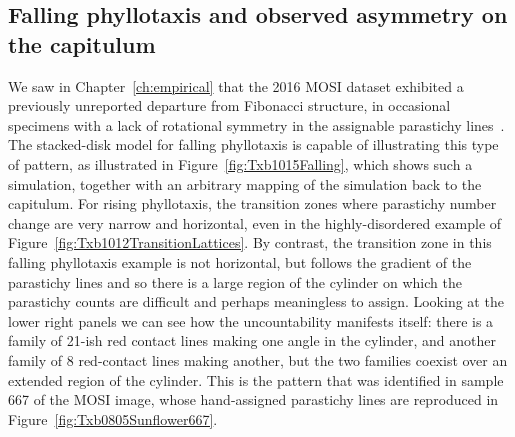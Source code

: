  

\subsection{Falling phyllotaxis and observed asymmetry on the capitulum}

We saw in Chapter~\ref{ch:empirical} that the 2016 MOSI dataset exhibited  a previously unreported departure from Fibonacci structure, in occasional specimens with a lack of rotational symmetry in the assignable parastichy lines~\cite{swintonNovelFibonacciNonFibonacci2016}. 
The stacked-disk model for falling phyllotaxis is  capable of illustrating this type of pattern, as illustrated in Figure~\ref{fig:Txb1015Falling}, which 
shows such a simulation, together with an arbitrary mapping of the simulation back to the capitulum. 
For rising phyllotaxis, the transition zones where parastichy number change are very narrow and horizontal, even in the highly-disordered example of Figure~\ref{fig:Txb1012TransitionLattices}. By contrast, the transition zone in this falling phyllotaxis example is not horizontal, but follows the gradient of the parastichy lines and so  there is a large region of the cylinder on which the parastichy counts are difficult and perhaps meaningless to assign. Looking at the lower right panels we can see how the uncountability manifests itself: there is a family of 21-ish red contact lines making one angle in the cylinder, and another family of 8 red-contact lines making another, but the two families coexist over an extended region of the cylinder. This is the pattern that was identified in sample 667 of the MOSI image, whose hand-assigned parastichy lines are reproduced in Figure~\ref{fig:Txb0805Sunflower667}.
 
 \clearpage
